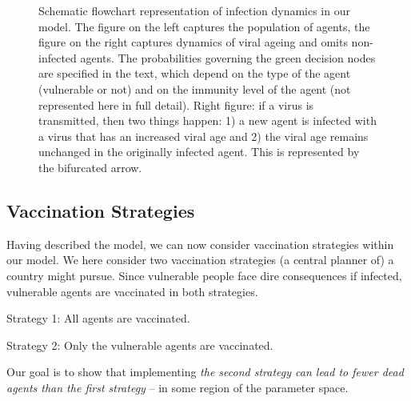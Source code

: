 \documentclass[a4paper,12pt]{article}
\begin{document}
\begin{figure}
\begin{center}
{
}      
\end{center}
\caption{Schematic flowchart representation of infection dynamics in our model. The figure on the left captures the population of agents, the figure on the right captures dynamics of viral ageing and omits non-infected agents. The probabilities governing the green decision nodes are specified in the text, which depend on the type of the agent (vulnerable or not) and on the immunity level of the agent (not represented here in full detail). Right figure: if a virus is transmitted, then two things happen: 1) a new agent is infected with a virus that has an increased viral age and 2) the viral age remains unchanged in the originally infected agent. This is represented by the bifurcated arrow.}
\label{fig:Flowchart}
\end{figure}

\subsection{Vaccination Strategies}
Having described the model, we can now consider vaccination strategies within our model. We here consider two vaccination strategies (a central planner of) a country might pursue. Since vulnerable people face dire consequences if infected, vulnerable agents are vaccinated in both strategies.
\begin{description}
\item Strategy 1: All agents are vaccinated.
\item Strategy 2: Only the vulnerable agents are vaccinated.
\end{description}
Our goal is to show that implementing \emph{the second strategy can lead to fewer dead agents than the first strategy} -- in some region of the parameter space. 
\end{document}
